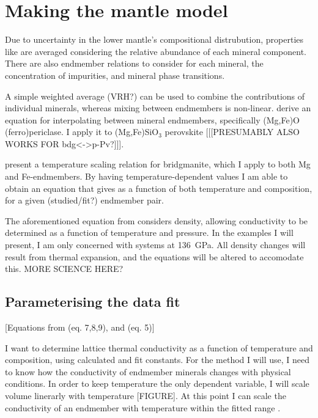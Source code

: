 \section{Making the mantle model}

Due to uncertainty in the lower mantle's compositional distrubution, properties like \tcs are averaged considering the relative abundance of each mineral component. There are also endmember relations to consider for each mineral, the concentration of impurities, and mineral phase transitions.  

A simple weighted average (VRH?) can be used to combine the contributions of individual minerals, whereas mixing between endmembers is non-linear. \citet{Ohta2017} derive an equation for interpolating \cs between mineral endmembers, specifically (Mg,Fe)O (ferro)periclase. I apply it to (Mg,Fe)SiO$_3$ perovskite [[[PRESUMABLY ALSO WORKS FOR bdg<->p-Pv?]]]. 

\citet{Okuda2017} present a temperature scaling relation for bridgmanite, which I apply to both Mg and Fe-endmembers. By having temperature-dependent values I am able to obtain an equation that gives \tcs as a function of both temperature and composition, for a given (studied/fit?) endmember pair.

The aforementioned equation from \citet{Okuda2017} considers density, allowing conductivity to be determined as a function of temperature and pressure. In the examples I will present, I am only concerned with systems at 136~GPa. All density changes will result from thermal expansion, and the equations will be altered to accomodate this. MORE SCIENCE HERE?

\subsection{Parameterising the data fit} 

[Equations from \cite{Ohta2017} (eq. 7,8,9), and \cite{Okuda2017} (eq. 5)]

I want to determine lattice thermal conductivity as a function of temperature and composition, using calculated and fit constants. For the method I will use, I need to know how the conductivity of endmember minerals changes with physical conditions. In order to keep temperature the only dependent variable, I will scale volume linerarly with temperature [FIGURE]. At this point I can scale the conductivity of an endmember with temperature within the fitted range \citep{Okuda2017}.

